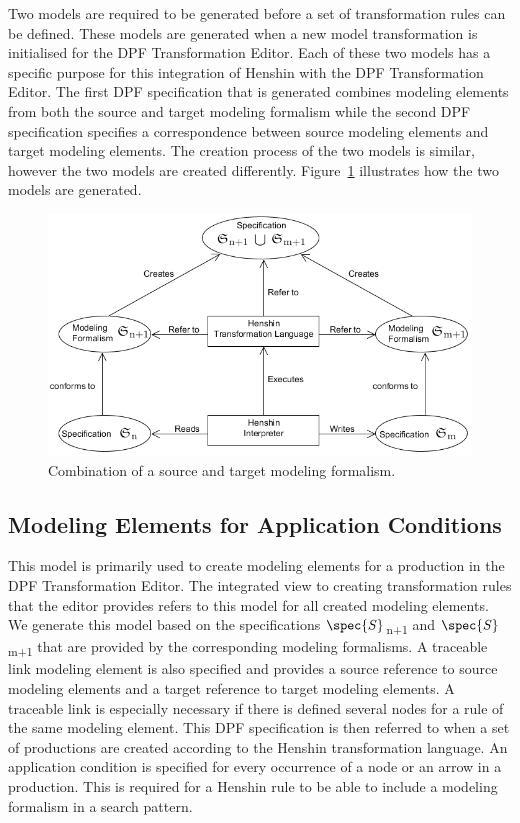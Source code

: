 Two models are required to be generated before a set of transformation rules can
be defined. These models are generated when a new model transformation is
initialised for the DPF Transformation Editor. Each of these two models has a
specific purpose for this integration of Henshin with the DPF Transformation
Editor. The first DPF specification that is generated combines modeling elements
from both the source and target modeling formalism while the second DPF specification
specifies a correspondence between source modeling elements and target modeling
elements. The creation process of the two models is similar, however the two
models are created differently. Figure~\ref{fig:Solution_CorrespondanceObjects}
illustrates how the two models are generated. 

\begin{figure}[H]
	\centering
	\includegraphics[scale=0.7]{./Figures/TransformationSolution_Correspond.png}
	\caption[Combination of a source and target modeling formalism]
	{Combination of a source and target modeling formalism.}
	\label{fig:Solution_CorrespondanceObjects}
\end{figure}

\subsection{Modeling Elements for Application Conditions}
\label{sec:modeling_elements}

This model is primarily used to create modeling elements for a production in the
DPF Transformation Editor. The integrated view to creating transformation rules
that the editor provides refers to this model for all created modeling elements.
We generate this model based on the specifications
$\spec{S}$\textsubscript{n+1} and $\spec{S}$\textsubscript{m+1} that are
provided by the corresponding modeling formalisms. A traceable link modeling
element is also specified and provides a source reference to source modeling
elements and a target reference to target modeling elements. A traceable link is
especially necessary if there is defined several nodes for a rule of the same
modeling element. This DPF specification is then referred to when a set of
productions are created according to the Henshin transformation language. An
application condition is specified for every occurrence of a node or an arrow in
a production. This is required for a Henshin rule to be able to include a
modeling formalism in a search pattern.

